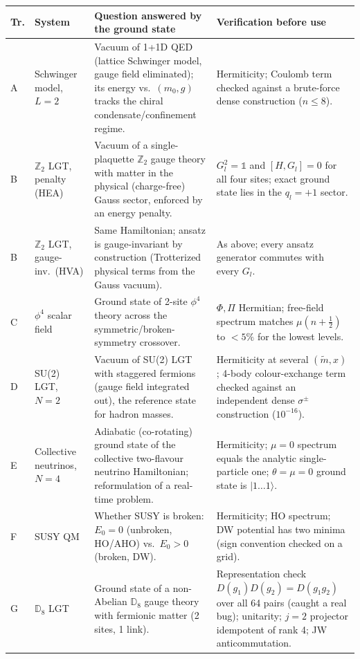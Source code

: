 \begin{tabular}{@{}llp{}p{}@{}}
\toprule
Tr. & System & Question answered by the ground state & Verification before use \\
\midrule
A & Schwinger model, $L{=}2$ & Vacuum of 1+1D QED (lattice Schwinger model, gauge field eliminated); its energy vs.\ $(m_0,g)$ tracks the chiral condensate/confinement regime. & Hermiticity; Coulomb term checked against a brute-force dense construction ($n\le8$). \\
B & $\mathbb{Z}_2$ LGT, penalty (HEA) & Vacuum of a single-plaquette $\mathbb{Z}_2$ gauge theory with matter in the physical (charge-free) Gauss sector, enforced by an energy penalty. & $G_l^2=\mathbb{1}$ and $[H,G_l]=0$ for all four sites; exact ground state lies in the $q_l{=}{+}1$ sector. \\
B & $\mathbb{Z}_2$ LGT, gauge-inv.\ (HVA) & Same Hamiltonian; ansatz is gauge-invariant by construction (Trotterized physical terms from the Gauss vacuum). & As above; every ansatz generator commutes with every $G_l$. \\
C & $\phi^4$ scalar field & Ground state of 2-site $\phi^4$ theory across the symmetric/broken-symmetry crossover. & $\Phi,\Pi$ Hermitian; free-field spectrum matches $\mu(n+\frac12)$ to $<5\%$ for the lowest levels. \\
D & SU(2) LGT, $N{=}2$ & Vacuum of SU(2) LGT with staggered fermions (gauge field integrated out), the reference state for hadron masses. & Hermiticity at several $(\tilde m,x)$; 4-body colour-exchange term checked against an independent dense $\sigma^\pm$ construction ($10^{-16}$). \\
E & Collective neutrinos, $N{=}4$ & Adiabatic (co-rotating) ground state of the collective two-flavour neutrino Hamiltonian; reformulation of a real-time problem. & Hermiticity; $\mu{=}0$ spectrum equals the analytic single-particle one; $\theta{=}\mu{=}0$ ground state is $|1\ldots1\rangle$. \\
F & SUSY QM & Whether SUSY is broken: $E_0{=}0$ (unbroken, HO/AHO) vs.\ $E_0{>}0$ (broken, DW). & Hermiticity; HO spectrum; DW potential has two minima (sign convention checked on a grid). \\
G & $\mathbb{D}_8$ LGT & Ground state of a non-Abelian $\mathbb{D}_8$ gauge theory with fermionic matter (2 sites, 1 link). & Representation check $D(g_1)D(g_2)=D(g_1g_2)$ over all 64 pairs (caught a real bug); unitarity; $j{=}2$ projector idempotent of rank 4; JW anticommutation. \\

\end{tabular}

